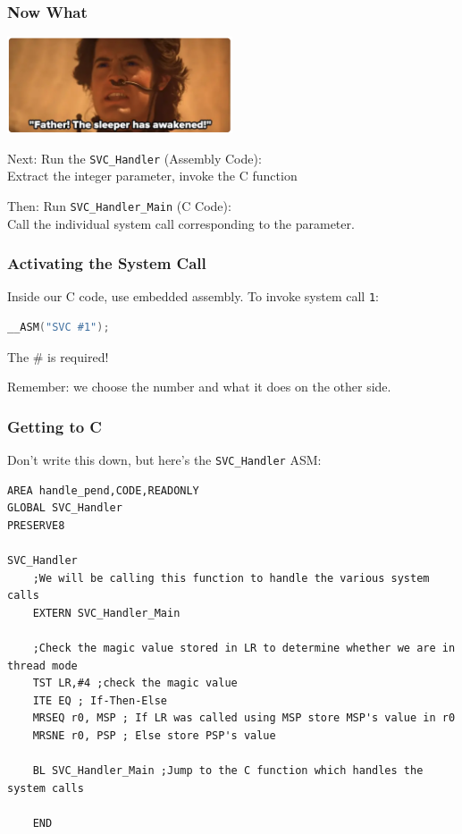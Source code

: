 \begin{frame}
\frametitle{Now What}

\begin{center}
  \includegraphics[width=0.5\textwidth]{images/sleeper.png}
\end{center}

Next: Run the \texttt{SVC\_Handler} (Assembly Code):\\
\quad Extract the integer parameter, invoke the C function

Then: Run \texttt{SVC\_Handler\_Main} (C Code):\\
\quad Call the individual system call corresponding to the parameter.

\end{frame}

\begin{frame}[fragile]
\frametitle{Activating the System Call}

Inside our C code, use embedded assembly. To invoke system call \texttt{1}:

\begin{lstlisting}[language=C]
__ASM("SVC #1");
\end{lstlisting}

The \# is required! 

Remember: we choose the number and what it does on the other side.
\end{frame}

\begin{frame}[fragile]
\frametitle{Getting to C}

Don't write this down, but here's the \texttt{SVC\_Handler} ASM:

\begin{lstlisting}
AREA handle_pend,CODE,READONLY
GLOBAL SVC_Handler
PRESERVE8

SVC_Handler
    ;We will be calling this function to handle the various system calls
    EXTERN SVC_Handler_Main
    
    ;Check the magic value stored in LR to determine whether we are in thread mode
    TST LR,#4 ;check the magic value
    ITE EQ ; If-Then-Else
    MRSEQ r0, MSP ; If LR was called using MSP store MSP's value in r0
    MRSNE r0, PSP ; Else store PSP's value
    
    BL SVC_Handler_Main ;Jump to the C function which handles the system calls
    
    END
\end{lstlisting}

\end{frame}


